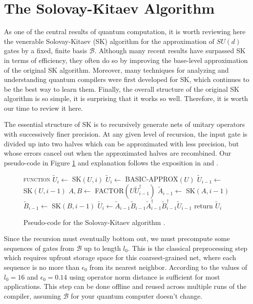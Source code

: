 \section{The Solovay-Kitaev Algorithm}
\label{sec:qcompile-sk}

As one of the central results of quantum computation, it is worth
reviewing here the venerable Solovay-Kitaev (SK) algorithm for the
approximation of $SU(d)$ gates by a fixed, finite basis $\mathcal{B}$.
Although many recent results have surpassed SK in terms of efficiency,
they often do so by improving the base-level approximation of the
original SK algorithm. Moreover, many techniques for analyzing
and understanding quantum compilers were first developed for SK, which
continues to be the best way to learn them. Finally, the overall
structure of the original SK algorithm is so simple, it is surprising
that it works so well. Therefore, it is worth
our time to review it here.

The essential structure of SK is to recursively generate nets of unitary
operators with
successively finer precision. At any given level of recursion, the input 
gate is divided up into two halves which can be
approximated with less precision, but whose errors cancel out
when the approximated halves are recombined. Our pseudo-code 
in Figure \ref{fig:sk-code} and explanation
follows the exposition in \cite{Dawson2005} and \cite{Harrow2001}.

\begin{figure}[hbt!]
\begin{center}
\begin{algorithmic}[1]
\STATE \textsc{function} $\tilde{U}_i \leftarrow$ SK$(U,i)$
\STATE $\tilde{U}_i \leftarrow $ BASIC-APPROX$(U)$
\ELSE
\STATE $\tilde{U}_{i-1} \leftarrow$ SK$(U, i-1)$
\STATE $A,B \leftarrow $ FACTOR$(U\tilde{U}^\dagger_{i-1})$
\STATE $\tilde{A}_{i-1} \leftarrow $ SK$(A, i-1)$
\STATE $\tilde{B}_{i-1} \leftarrow $ SK$(B, i-1)$
\STATE $\tilde{U}_i \leftarrow \tilde{A}_{i-1}\tilde{B}_{i-1}\tilde{A}^\dagger_{i-1}\tilde{B}^\dagger_{i-1}\tilde{U}_{i-1}$
\ENDIF
\STATE return $\tilde{U}_i$
\end{algorithmic}
\caption{Pseudo-code for the Solovay-Kitaev algorithm \cite{Dawson2005}.}
\label{fig:sk-code}
\end{center}
\end{figure}

Since the recursion must eventually bottom out, we must precompute some sequences
of gates from $\mathcal{B}$ up to length $l_0$. This is the classical
preprocessing step which requires upfront storage space for this
coarsest-grained net, where
each sequence is no more than $\epsilon_0$ from its nearest neighbor. According
to \cite{Dawson2005} the values of $l_0=16$ and $\epsilon_0 = 0.14$ using
operator norm distance is sufficient for most applications.
This step can be
done offline and reused across multiple runs of the compiler, assuming
$\mathcal{B}$ for your quantum computer doesn't change.

